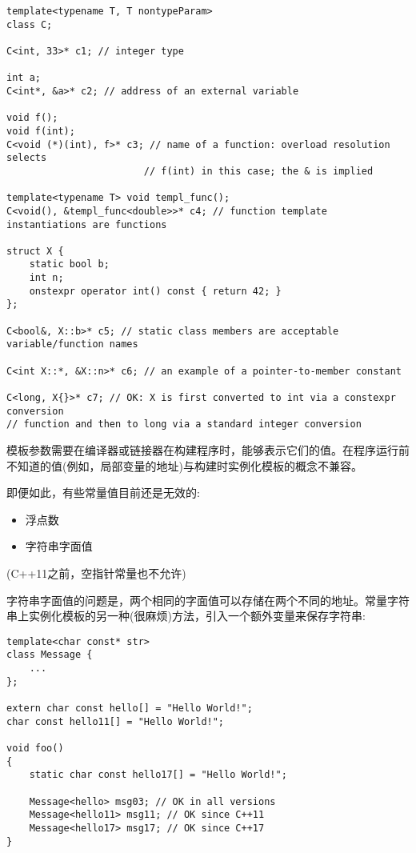 \begin{lstlisting}[style=styleCXX]
template<typename T, T nontypeParam>
class C;

C<int, 33>* c1; // integer type

int a;
C<int*, &a>* c2; // address of an external variable

void f();
void f(int);
C<void (*)(int), f>* c3; // name of a function: overload resolution selects
						// f(int) in this case; the & is implied

template<typename T> void templ_func();
C<void(), &templ_func<double>>* c4; // function template instantiations are functions

struct X {
	static bool b;
	int n;
	onstexpr operator int() const { return 42; }
};

C<bool&, X::b>* c5; // static class members are acceptable variable/function names

C<int X::*, &X::n>* c6; // an example of a pointer-to-member constant

C<long, X{}>* c7; // OK: X is first converted to int via a constexpr conversion
// function and then to long via a standard integer conversion
\end{lstlisting}

模板参数需要在编译器或链接器在构建程序时，能够表示它们的值。在程序运行前不知道的值(例如，局部变量的地址)与构建时实例化模板的概念不兼容。

即便如此，有些常量值目前还是无效的:

\begin{itemize}
\item 
浮点数

\item 
字符串字面值
\end{itemize}

(C++11之前，空指针常量也不允许)

字符串字面值的问题是，两个相同的字面值可以存储在两个不同的地址。常量字符串上实例化模板的另一种(很麻烦)方法，引入一个额外变量来保存字符串:

\begin{lstlisting}[style=styleCXX]
template<char const* str>
class Message {
	...
};

extern char const hello[] = "Hello World!";
char const hello11[] = "Hello World!";

void foo()
{
	static char const hello17[] = "Hello World!";
	
	Message<hello> msg03; // OK in all versions
	Message<hello11> msg11; // OK since C++11
	Message<hello17> msg17; // OK since C++17
}
\end{lstlisting}

